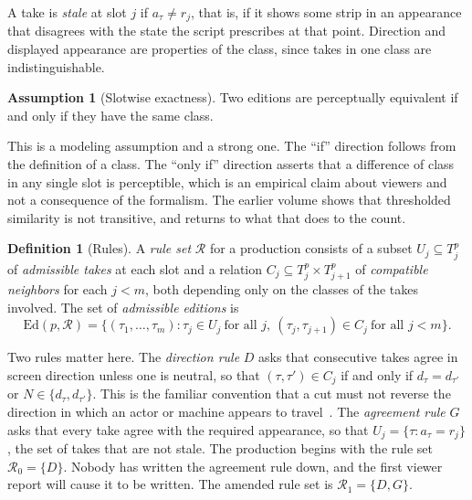 \documentclass[11pt,twoside,openright]{book}
\theoremstyle{plain}
\theoremstyle{definition}
\newtheorem{definition}[theorem]{Definition}
\newtheorem{assumption}[theorem]{Assumption}
\theoremstyle{remark}
\newcommand{\Ed}{\mathrm{Ed}}       %
\begin{document}
A take is \emph{stale} at slot $j$ if $a_\tau\ne r_j$, that is, if it shows some strip in an appearance that disagrees with the state the script prescribes at that point. Direction and displayed appearance are properties of the class, since takes in one class are indistinguishable.

\begin{assumption}[Slotwise exactness]\label{ass:slotwise}
Two editions are perceptually equivalent if and only if they have the same class.
\end{assumption}

This is a modeling assumption and a strong one. The ``if'' direction follows from the definition of a class. The ``only if'' direction asserts that a difference of class in any single slot is perceptible, which is an empirical claim about viewers and not a consequence of the formalism. The earlier volume shows that thresholded similarity is not transitive, and  returns to what that does to the count.

\begin{definition}[Rules]\label{def:rules}
A \emph{rule set} $\mathcal R$ for a production consists of a subset $U_j\subseteq T^p_j$ of \emph{admissible takes} at each slot and a relation $C_j\subseteq T^p_j\times T^p_{j+1}$ of \emph{compatible neighbors} for each $j<m$, both depending only on the classes of the takes involved. The set of \emph{admissible editions} is
\[
\Ed(p,\mathcal R)=\bigl\{(\tau_1,\dots,\tau_m):\tau_j\in U_j\ \text{for all }j,\ (\tau_j,\tau_{j+1})\in C_j\ \text{for all }j<m\bigr\}.
\]
\end{definition}

Two rules matter here. The \emph{direction rule} $D$ asks that consecutive takes agree in screen direction unless one is neutral, so that $(\tau,\tau')\in C_j$ if and only if $d_\tau=d_{\tau'}$ or $N\in\{d_\tau,d_{\tau'}\}$. This is the familiar convention that a cut must not reverse the direction in which an actor or machine appears to travel~\cite{bordwell1985classical}. The \emph{agreement rule} $G$ asks that every take agree with the required appearance, so that $U_j=\{\tau:a_\tau=r_j\}$, the set of takes that are not stale. The production begins with the rule set $\mathcal R_0=\{D\}$. Nobody has written the agreement rule down, and the first viewer report will cause it to be written. The amended rule set is $\mathcal R_1=\{D,G\}$.
\end{document}
